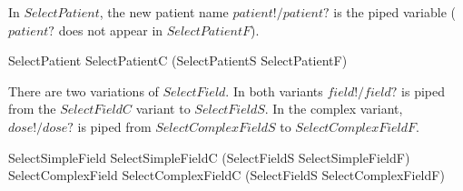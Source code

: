 In $SelectPatient$, the new patient name $patient!/patient?$ is the
piped variable ($patient?$ does not appear in $SelectPatientF$).

\begin{zed} 
SelectPatient  SelectPatientC \pipe (SelectPatientS \land SelectPatientF)
\end{zed}
There are two variations of 
$SelectField$.  In both variants $field!/field?$ is piped from 
the $SelectFieldC$ variant to $SelectFieldS$.  In the complex variant,
$dose!/dose?$ is piped from $SelectComplexFieldS$ to $SelectComplexFieldF$.

\begin{zed} 
	SelectSimpleField  SelectSimpleFieldC \pipe (SelectFieldS \land SelectSimpleFieldF)
\also
	SelectComplexField  SelectComplexFieldC \pipe (SelectFieldS \land SelectComplexFieldF)
\end{zed}


